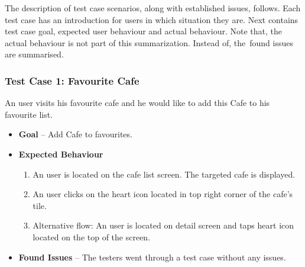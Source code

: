 The description of test case scenarios, along with established issues, follows. Each test case has an introduction for users in which situation they are.  Next contains test case goal, expected user behaviour and actual behaviour. Note that, the actual behaviour is not part of this summarization. Instead of, the~found issues are summarised. 
\subsubsection{Test Case 1: Favourite Cafe}
An user visits his favourite cafe and he would like to add this Cafe to his favourite list. 
\begin{itemize}
    \item \textbf{Goal} -- Add Cafe to favourites.
    \item \textbf{Expected Behaviour}
    \begin{enumerate}
        \item An user is located on the cafe list screen. The targeted cafe is displayed.
        \item An user clicks on the heart icon located in top right corner of the cafe's tile. 
        \item Alternative flow: An user is located on detail screen and taps heart icon located on the top of the screen. 
    \end{enumerate}
    \item \textbf{Found Issues} -- The testers went through a test case without any issues.
\end{itemize}
